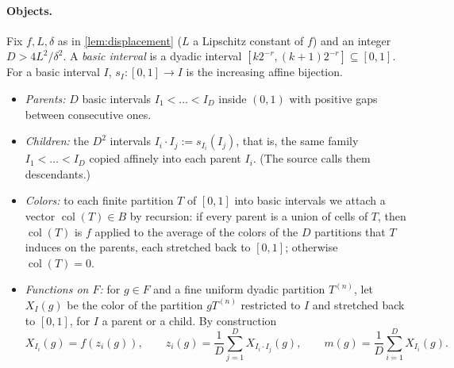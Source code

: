 \documentclass[11pt]{article}
\DeclareMathOperator{\colr}{col}
\theoremstyle{definition}
\numberwithin{equation}{section}
\begin{document}
\paragraph{Objects.}
Fix \(f,L,\delta\) as in \cref{lem:displacement} (\(L\) a Lipschitz constant
of \(f\)) and an integer \(D>4L^2/\delta^2\). A \emph{basic interval} is a
dyadic interval \([k2^{-r},(k+1)2^{-r}]\subseteq[0,1]\). For a basic
interval \(I\), \(s_I:[0,1]\to I\) is the increasing affine bijection.
\begin{itemize}
\item \emph{Parents:} \(D\) basic intervals \(I_1<\dots<I_D\) inside
\((0,1)\) with positive gaps between consecutive ones.
\item \emph{Children:} the \(D^2\) intervals \(I_i\cdot I_j:=s_{I_i}(I_j)\),
that is, the same family \(I_1<\dots<I_D\) copied affinely into each parent
\(I_i\). (The source calls them descendants.)
\item \emph{Colors:} to each finite partition \(T\) of \([0,1]\) into basic
intervals we attach a vector \(\colr(T)\in B\) by recursion: if every parent
is a union of cells of \(T\), then \(\colr(T)\) is \(f\) applied to the
average of the colors of the \(D\) partitions that \(T\) induces on the
parents, each stretched back to \([0,1]\); otherwise \(\colr(T)=0\).
\item \emph{Functions on \(F\):} for \(g\in F\) and a fine uniform dyadic
partition \(T^{(n)}\), let \(X_I(g)\) be the color of the partition
\(gT^{(n)}\) restricted to \(I\) and stretched back to \([0,1]\), for \(I\) a
parent or a child. By construction
\[
 X_{I_i}(g)=f(z_i(g)),\qquad
 z_i(g)=\frac1D\sum_{j=1}^D X_{I_i\cdot I_j}(g),\qquad
 m(g)=\frac1D\sum_{i=1}^D X_{I_i}(g).
\]
\end{itemize}
\end{document}
